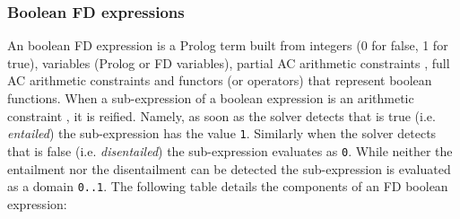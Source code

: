 \subsubsection{Boolean FD expressions}
\label{Boolean-FD-expressions}

An boolean FD expression is a Prolog term built from integers (0 for false,
1 for true), variables (Prolog or FD variables), partial AC arithmetic
constraints , full AC arithmetic constraints
 and functors (or operators) that represent
boolean functions. When a sub-expression of a boolean expression is an
arithmetic constraint , it is reified. Namely, as soon as the
solver detects that  is true (i.e. \emph{entailed}) the
sub-expression has the value \texttt{1}. Similarly when the solver detects
that  is false (i.e. \emph{disentailed}) the sub-expression
evaluates as \texttt{0}. While neither the entailment nor the disentailment
can be detected the sub-expression is evaluated as a domain \texttt{0..1}.
The following table details the components of an FD boolean expression:

